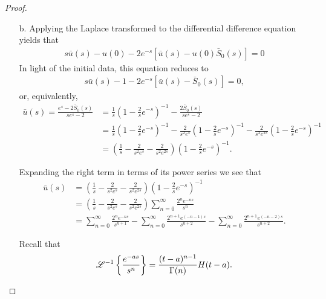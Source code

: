 \begin{proof}
\begin{enumerate}
    \item[b.] Applying the Laplace transformed to the differential difference equation yields
      that
      \begin{align*}
        s\bar{u}(s) - u(0) - 2e^{-s}\left[\bar{u}(s) - u(0)\bar{S}_0(s)\right] = 0
      \end{align*}
      In light of the initial data, this equation reduces to
      \begin{align*}
        s\bar{u}(s) - 1 - 2e^{-s}\left[\bar{u}(s) - \bar{S}_0(s)\right] = 0,
      \end{align*}
      or, equivalently,
      \begin{align*}
        \bar{u}(s) = \frac{e^s-2\bar{S}_0(s)}{se^{s}-2}
        &= \frac{1}{s}\left(1-\frac{2}{s}e^{-s}\right)^{-1} - \frac{2\bar{S}_0(s)}{se^{s}-2} \\
        &= \frac{1}{s}\left(1-\frac{2}{s}e^{-s}\right)^{-1} - \frac{2}{s^2e^s}\left(1-\frac{2}{s}e^{-s}\right)^{-1} - \frac{2}{s^2e^{2s}}\left(1-\frac{2}{s}e^{-s}\right)^{-1} \\
        &= \left(\frac{1}{s} - \frac{2}{s^2e^s} - \frac{2}{s^2e^{2s}}\right)\left(1-\frac{2}{s}e^{-s}\right)^{-1}.
      \end{align*}

      Expanding the right term in terms of its power series we see that
      \begin{align*}
        \bar{u}(s)
        &= \left(\frac{1}{s} - \frac{2}{s^2e^s} - \frac{2}{s^2e^{2s}}\right)\left(1-\frac{2}{s}e^{-s}\right)^{-1} \\
        &= \left(\frac{1}{s} - \frac{2}{s^2e^s} - \frac{2}{s^2e^{2s}}\right) \sum_{n=0}^\infty \frac{2^ne^{-ns}}{s^n}\\
        &=\sum_{n=0}^\infty \frac{2^ne^{-ns}}{s^{n+1}} - \sum_{n=0}^\infty \frac{2^{n+1}e^{(-n-1)s}}{s^{n+2}} - \sum_{n=0}^\infty \frac{2^{n+1}e^{(-n-2)s}}{s^{n+2}}.
      \end{align*}

      Recall that
      \begin{align*}
        \mathscr{L}^{-1}\left\{ {\frac{e^{-as}}{s^n}} \right\} = \frac{(t-a)^{n-1}}{\Gamma(n)}H(t-a).
      \end{align*}


\end{enumerate}
\end{proof}
